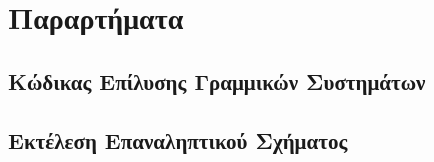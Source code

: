 \documentclass[assignment2.tex]{subfiles}
\begin{document}
\section*{Παραρτήματα}
\subsection*{Κώδικας Επίλυσης Γραμμικών Συστημάτων}


\subsection*{Εκτέλεση Επαναληπτικού Σχήματος}

\end{document}
